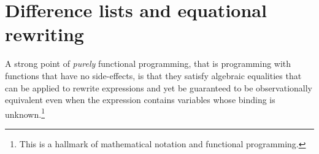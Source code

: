 \section*{Difference lists and equational rewriting}

A strong point of \emph{purely} functional programming, that is programming with functions that have no side-effects, is that they satisfy algebraic equalities that can be applied to rewrite expressions and yet be guaranteed to be observationally equivalent even when the expression contains variables whose binding is unknown.\footnote{This is a hallmark of mathematical notation and functional programming. 
}

